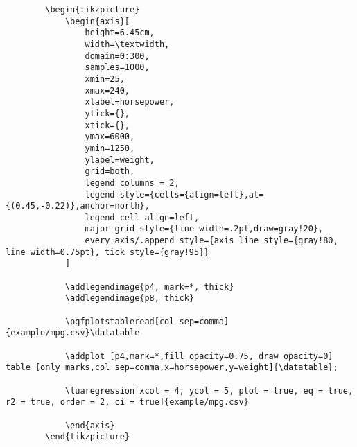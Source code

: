 \documentclass[11pt]{article}
\begin{document}
    \begin{verbatim}
        \begin{tikzpicture}
            \begin{axis}[
                height=6.45cm,
                width=\textwidth,
                domain=0:300,
                samples=1000,
                xmin=25,
                xmax=240,
                xlabel=horsepower,
                ytick={},
                xtick={},
                ymax=6000,
                ymin=1250,
                ylabel=weight,
                grid=both,
                legend columns = 2,
                legend style={cells={align=left},at={(0.45,-0.22)},anchor=north},
                legend cell align=left,
                major grid style={line width=.2pt,draw=gray!20},
                every axis/.append style={axis line style={gray!80, line width=0.75pt}, tick style={gray!95}}
            ]

            \addlegendimage{p4, mark=*, thick}
            \addlegendimage{p8, thick}

            \pgfplotstableread[col sep=comma]{example/mpg.csv}\datatable

            \addplot [p4,mark=*,fill opacity=0.75, draw opacity=0] table [only marks,col sep=comma,x=horsepower,y=weight]{\datatable};

            \luaregression[xcol = 4, ycol = 5, plot = true, eq = true, r2 = true, order = 2, ci = true]{example/mpg.csv}

            \end{axis}
        \end{tikzpicture}
    \end{verbatim}

    \pagebreak
\end{document}
